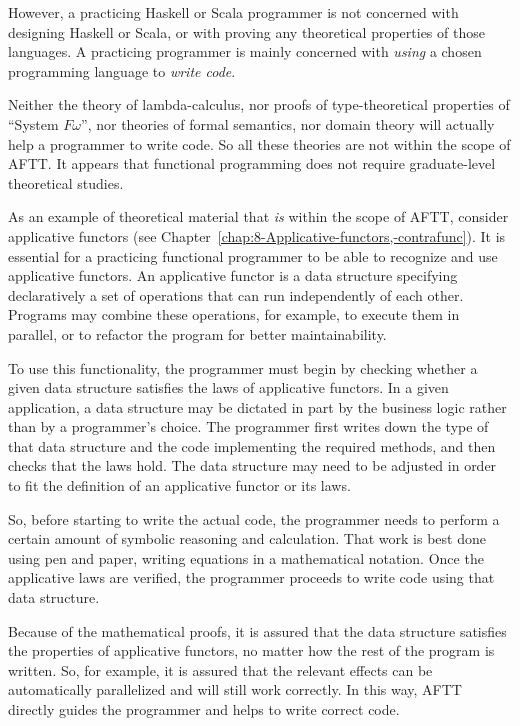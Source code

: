 However, a practicing Haskell or Scala programmer is not concerned
with designing Haskell or Scala, or with proving any theoretical properties
of those languages. A practicing programmer is mainly concerned with
\emph{using} a chosen programming language to \emph{write code}. 

Neither the theory of lambda-calculus, nor proofs of type-theoretical
properties of ``System $F\omega$'', nor theories of formal semantics,
nor domain theory will actually help a programmer to write code. So
all these theories are not within the scope of AFTT. It appears that
functional programming does not require graduate-level theoretical
studies.

As an example of theoretical material that \emph{is} within the scope
of AFTT, consider applicative functors (see Chapter~\ref{chap:8-Applicative-functors,-contrafunc}).
It is essential for a practicing functional programmer to be able
to recognize and use applicative functors. An applicative functor
is a data structure specifying declaratively a set of operations that
can run independently of each other. Programs may combine these operations,
for example, to execute them in parallel, or to refactor the program
for better maintainability.

To use this functionality, the programmer must begin by checking whether
a given data structure satisfies the laws of applicative functors.
In a given application, a data structure may be dictated in part by
the business logic rather than by a programmer's choice. The programmer
first writes down the type of that data structure and the code implementing
the required methods, and then checks that the laws hold. The data
structure may need to be adjusted in order to fit the definition of
an applicative functor or its laws.

So, before starting to write the actual code, the programmer needs
to perform a certain amount of symbolic reasoning and calculation.
That work is best done using pen and paper, writing equations in a
mathematical notation. Once the applicative laws are verified, the
programmer proceeds to write code using that data structure.

Because of the mathematical proofs, it is assured that the data structure
satisfies the properties of applicative functors, no matter how the
rest of the program is written. So, for example, it is assured that
the relevant effects can be automatically parallelized and will still
work correctly. In this way, AFTT directly guides the programmer and
helps to write correct code.

